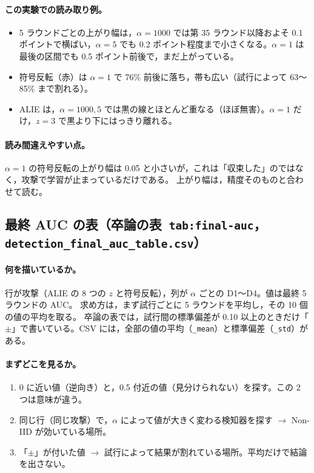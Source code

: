 \documentclass[a4j, dvipdfmx]{jsarticle}  %
\begin{document}
\paragraph{この実験での読み取り例。}
\begin{itemize}
  \item 5 ラウンドごとの上がり幅は，$\alpha = 1000$ では第 35 ラウンド以降およそ 0.1 ポイントで横ばい，$\alpha = 5$ でも 0.2 ポイント程度まで小さくなる。$\alpha = 1$ は最後の区間でも 0.5 ポイント前後で，まだ上がっている。
  \item 符号反転（赤）は $\alpha = 1$ で 76\% 前後に落ち，帯も広い（試行によって 63〜85\% まで割れる）。
  \item ALIE は，$\alpha = 1000, 5$ では黒の線とほとんど重なる（ほぼ無害）。$\alpha = 1$ だけ，$z = 3$ で黒より下にはっきり離れる。
\end{itemize}

\paragraph{読み間違えやすい点。}
$\alpha = 1$ の符号反転の上がり幅は 0.05 と小さいが，これは「収束した」のではなく，攻撃で学習が止まっているだけである。
上がり幅は，精度そのものと合わせて読む。

\subsection{最終 AUC の表（卒論の表\ \texttt{tab:final-auc}，\texttt{detection\_final\_auc\_table.csv}）}

\paragraph{何を描いているか。}
行が攻撃（ALIE の 8 つの $z$ と符号反転），列が $\alpha$ ごとの D1〜D4。値は最終 5 ラウンドの AUC。
求め方は，まず試行ごとに 5 ラウンドを平均し，その 10 個の値の平均を取る。
卒論の表では，試行間の標準偏差が 0.10 以上のときだけ「$\pm$」で書いている。CSV には，全部の値の平均（\texttt{\_mean}）と標準偏差（\texttt{\_std}）がある。

\paragraph{まずどこを見るか。}
\begin{enumerate}
  \item 0 に近い値（逆向き）と，0.5 付近の値（見分けられない）を探す。この 2 つは意味が違う。
  \item 同じ行（同じ攻撃）で，$\alpha$ によって値が大きく変わる検知器を探す $\rightarrow$ Non-IID が効いている場所。
  \item 「$\pm$」が付いた値 $\rightarrow$ 試行によって結果が割れている場所。平均だけで結論を出さない。
\end{enumerate}
\end{document}
